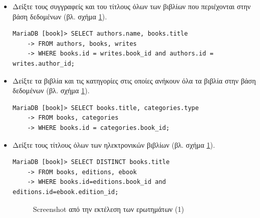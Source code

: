 \documentclass{assignment}
\begin{document}
\begin{itemize}

\item Δείξτε τους συγγραφείς και του τίτλους όλων των βιβλίων που περιέχονται στην βάση δεδομένων (βλ. σχήμα \ref{fig:queries_1}).
\begin{verbatim}
MariaDB [book]> SELECT authors.name, books.title 
    -> FROM authors, books, writes 
    -> WHERE books.id = writes.book_id and authors.id = writes.author_id;
\end{verbatim}

\item Δείξτε τα βιβλία και τις κατηγορίες στις οποίες ανήκουν όλα τα βιβλία στην βάση δεδομένων (βλ. σχήμα \ref{fig:queries_1}).
\begin{verbatim}
MariaDB [book]> SELECT books.title, categories.type 
    -> FROM books, categories 
    -> WHERE books.id = categories.book_id;
\end{verbatim}

\item Δείξτε τους τίτλους όλων των ηλεκτρονικών βιβλίων (βλ. σχήμα \ref{fig:queries_1}).
\begin{verbatim}
MariaDB [book]> SELECT DISTINCT books.title
    -> FROM books, editions, ebook
    -> WHERE books.id=editions.book_id and editions.id=ebook.edition_id;
\end{verbatim}

\begin{figure}
\begin{center}
\caption{Screenshot από την εκτέλεση των ερωτημάτων (1)}
\label{fig:queries_1}
\end{center}
\end{figure}


\end{itemize}
\end{document}
